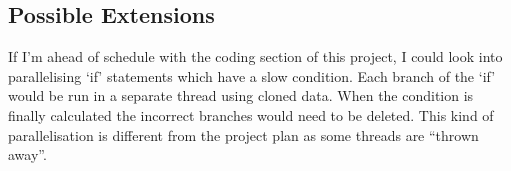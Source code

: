 \documentclass[12pt, a4paper]{article}
\begin{document}
\begin{comment}
\begin{itemize}
	\item Create two plugins, a linter and a syntax extension
	\begin{itemize}
		\item Get the linter plugin to:
		\begin{itemize}
			\item Analyse the programs statements to see what variables each statement depends on and what variables the statement modifies (if any)
			\item Produce a dependency tree for the entire program based on this analysis
			\item Look for areas in the tree which do not depend on one another, these areas could be run in parallel
			\item Estimate the speed of each statement for the dependency tree
			\item Record the areas that could be changed into a file
		\end{itemize}
		\item Get the syntax extension plugin to:
		\begin{itemize}
			\item Read the file the Linter plugin creates
			\item First try one statement in parallel to test it works
			\item Then try to run everything in parallel to test it works
			\item Then
		\end{itemize}
	\end{itemize}
	\item Do some testing
\end{itemize}
\end{comment}

\subsection{Possible Extensions}
If I'm ahead of schedule with the coding section of this project, I could look into parallelising `if' statements which have a slow condition. Each branch of the `if' would be run in a separate thread using cloned data. When the condition is finally calculated the incorrect branches would need to be deleted. This kind of parallelisation is different from the project plan as some threads are ``thrown away''.
\end{document}
